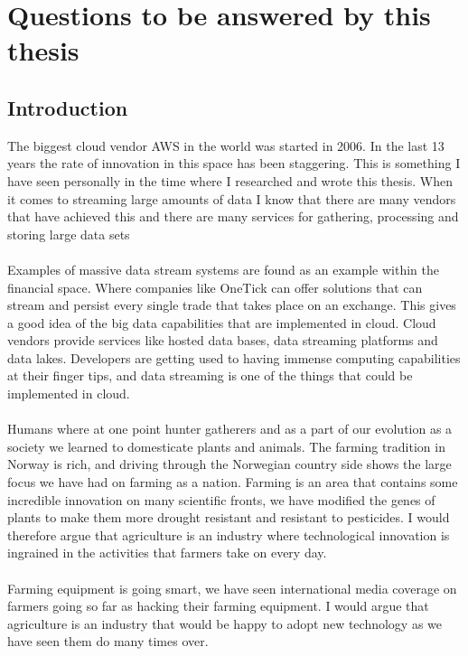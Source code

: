 \documentclass[]{uiophd}
\begin{document}
\section{Questions to be answered by this thesis}

\subsection{Introduction }
The biggest cloud vendor AWS in the world was started in 2006. \parencite{Gartner} In the last 13 years the rate of innovation in this space has been staggering. This is something I have seen personally in the time where I researched and wrote this thesis. When it comes to streaming large amounts of data I know that there are many vendors that have achieved this and there are many services for gathering, processing and storing large data sets
\\\\
Examples of massive data stream systems are found as an example within the financial space. Where companies like OneTick can offer solutions that can stream and persist every single trade that takes place on an exchange. This gives a good idea of the big data capabilities that are implemented in cloud. \parencite{OneTick} Cloud vendors provide services like hosted data bases, data streaming platforms and data lakes. Developers are getting used to having immense computing capabilities at their finger tips, and data streaming is one of the things that could be implemented in cloud.  
\\\\
Humans where at one point hunter gatherers and as a part of our evolution as a society we learned to domesticate plants and animals. The farming tradition in Norway is rich, and driving through the Norwegian country side shows the large focus we have had on farming as a nation. Farming is an area that contains some incredible innovation on many scientific fronts, we have modified the genes of plants to make them more drought resistant and resistant to pesticides. I would therefore argue that agriculture is an industry where technological innovation is ingrained in the activities that farmers take on every day.
\\\\
Farming equipment is going smart, we have seen international media coverage on farmers going so far as hacking their farming equipment. I would argue that agriculture is an industry that would be happy to adopt new technology as we have seen them do many times over.\parencite{motherboard}
\end{document}
